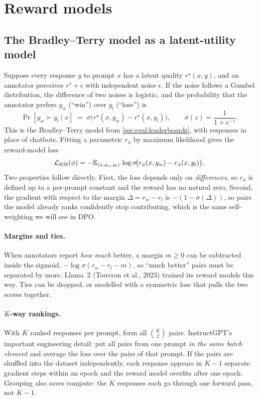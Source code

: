 \section{Reward models}\label{sec:rlhf:rm}

\subsection{The Bradley--Terry model as a latent-utility model}

Suppose every response $y$ to prompt $x$ has a latent quality $r^\star(x,y)$, and an annotator
perceives $r^\star + \epsilon$ with independent noise $\epsilon$. If the noise follows a Gumbel
distribution, the difference of two noises is logistic, and the probability that the annotator
prefers $y_w$ (``win'') over $y_l$ (``lose'') is
\begin{equation}
  \Pr[y_w \succ y_l \mid x] \;=\; \sigma\!\big(r^\star(x,y_w) - r^\star(x,y_l)\big),
  \qquad \sigma(z)=\frac{1}{1+e^{-z}}.
  \label{eq:rlhf:bt}
\end{equation}
This is the Bradley--Terry model from \cref{sec:eval:leaderboards}, with responses in place of
chatbots. Fitting a parametric $r_\phi$ by maximum likelihood gives the reward-model loss
\begin{equation}
  \mathcal{L}_{\text{RM}}(\phi) = -\mathbb{E}_{(x,y_w,y_l)}\,\log\sigma\!\big(r_\phi(x,y_w)-r_\phi(x,y_l)\big).
  \label{eq:rlhf:rmloss}
\end{equation}
Two properties follow directly. First, the loss depends only on \emph{differences}, so
$r_\phi$ is defined up to a per-prompt constant and the reward has no natural zero. Second, the
gradient with respect to the margin $\Delta = r_w - r_l$ is $-(1-\sigma(\Delta))$, so pairs the
model already ranks confidently stop contributing, which is the same self-weighting we will
see in DPO.

\paragraph{Margins and ties.} When annotators report \emph{how much} better, a margin
$m\ge 0$ can be subtracted inside the sigmoid, $-\log\sigma(r_w-r_l-m)$, so ``much better'' pairs
must be separated by more. Llama~2 (Touvron et al., 2023) trained its reward models this way.
Ties can be dropped, or modelled with a symmetric loss that pulls the two scores together.

\paragraph{$K$-way rankings.} With $K$ ranked responses per prompt, form all $\binom{K}{2}$ pairs.
InstructGPT's important engineering detail: put all pairs from one prompt \emph{in the same batch
element} and average the loss over the pairs of that prompt. If the pairs are shuffled into the
dataset independently, each response appears in $K-1$ separate gradient steps within an epoch and
the reward model overfits after one epoch. Grouping also saves compute: the $K$ responses each go
through one forward pass, not $K-1$.

